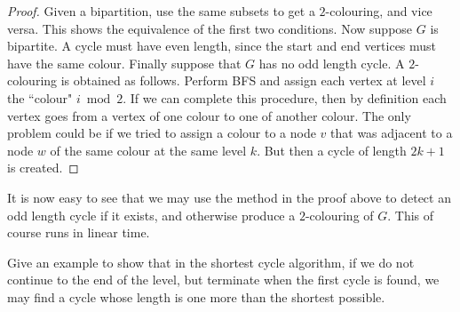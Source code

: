 \begin{proof} 
Given a bipartition, use the same subsets to get a $2$-colouring, and
vice versa. This shows the equivalence of the first two conditions. Now
suppose $G$ is bipartite.  A cycle must have even length, since the start
and end vertices must have the same colour. Finally suppose that $G$
has no odd length cycle. A $2$-colouring is obtained as follows. Perform
BFS and assign each vertex at level $i$ the ``colour" $i \bmod 2$. If we
can complete this procedure, then by definition each vertex goes from
a vertex of one colour to one of another colour. The only problem could
be if we tried to assign a colour to a node $v$ that was adjacent to a
node $w$ of the same colour at the same level $k$. But then a cycle of
length $2k+1$ is created.
\end{proof}

It is now easy to see that we may use the method in the proof above
to detect an odd length cycle if it exists, and otherwise produce a
$2$-colouring of $G$. This of course runs in linear time.


\begin{Exercise}
\label{ex:shortest-cycle-thm}
Give an example to show that in the shortest cycle algorithm, if we
do not continue to the end of the level, but terminate when the first
cycle is found, we may find a cycle whose length is one more than the
shortest possible.
\end{Exercise}

%

